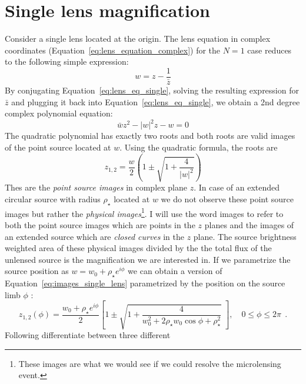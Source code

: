 \documentclass[12pt,dvipsnames]{report}
\newcommand{\hquad}{~~}
\begin{document}
\section{Single lens magnification}
\label{sec:single_lens_mag}

Consider a single lens located at the origin. The lens equation in complex
coordinates (Equation~\ref{eq:lens_equation_complex}) for the $N=1$ case
reduces to the following simple expression:
\begin{equation}
    w = z - \frac{1}{\bar{z}}
    \label{eq:lens_eq_single}
\end{equation}
By conjugating Equation~\ref{eq:lens_eq_single}, solving the resulting expression
for $\bar{z}$ and plugging it back into Equation~\ref{eq:lens_eq_single}, we
obtain a 2nd degree complex polynomial equation:
\begin{equation}
    \bar{w}z^2-|w|^2 z - w = 0
    \label{eq:complex_poly_single}
\end{equation}
The quadratic polynomial has exactly two roots and both roots are valid images
of the point source located at $w$. Using the quadratic formula, the roots are
\begin{equation}
    z_{1,2} = \frac{w}{2}\left(1 \pm \sqrt{1 +\frac{4}{|w|^2}}\right)
    \label{eq:images_single_lens}
\end{equation}
Thes are the \emph{point source images} in complex plane $z$. In case of an
extended circular source
with radius $\rho_\star$ located at $w$ we do not observe these point source
images but rather the \emph{physical images}\footnote{These images are what we would
    see if we could resolve the microlensing event.}. I will use the word images
to refer to both the point source images which are points in the $z$ planes and
the images of an extended source which are \emph{closed curves} in the $z$ plane.
The source
brightness weighted area of these physical images divided by the the total flux
of the unlensed source is the magnification we are interested in.
If we parametrize the source  position as $w=w_0+\rho_\star e^{i\phi}$ we
can obtain a version of Equation~\ref{eq:images_single_lens} parametrized by
the position on the source limb $\phi$ \citep{1994ApJ...430..505W}:
\begin{equation}
    z_{1,2}(\phi)=\frac{w_0+\rho_\star e^{i \phi}}{2}\left[1 \pm \sqrt{1+\frac{4}{w_0^{2}+2 \rho_\star
    w_0 \cos \phi+\rho_\star^{2}}}\;\right], \quad 0 \leq \phi\leq 2 \pi\hquad .
\end{equation}
Following \citet{1994ApJ...430..505W} differentiate between  three different
\end{document}
